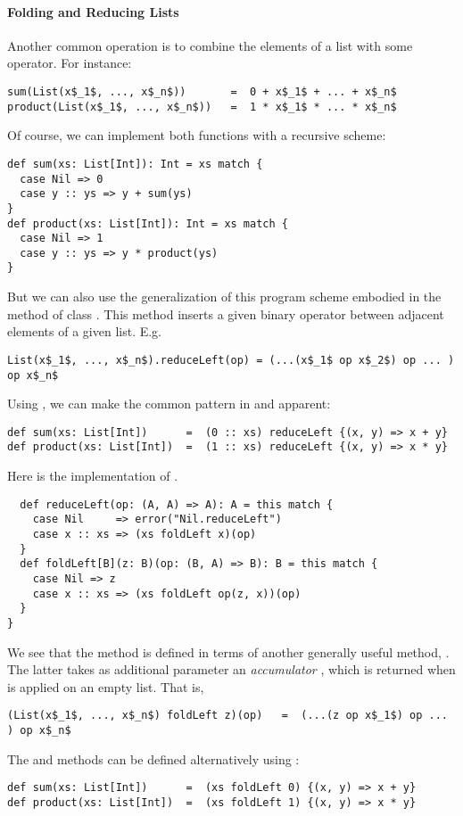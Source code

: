\paragraph{Folding and Reducing Lists}
Another common operation is to combine the elements of a list with
some operator.  For instance:
\begin{lstlisting}
sum(List(x$_1$, ..., x$_n$))       =  0 + x$_1$ + ... + x$_n$
product(List(x$_1$, ..., x$_n$))   =  1 * x$_1$ * ... * x$_n$
\end{lstlisting}
Of course, we can implement both functions with a
recursive scheme:
\begin{lstlisting}
def sum(xs: List[Int]): Int = xs match {
  case Nil => 0
  case y :: ys => y + sum(ys)
}
def product(xs: List[Int]): Int = xs match {
  case Nil => 1
  case y :: ys => y * product(ys)
}
\end{lstlisting}
But we can also use the generalization of this program scheme embodied
in the  method of class .  This method
inserts a given binary operator between adjacent elements of a given list.
E.g.\ 
\begin{lstlisting}
List(x$_1$, ..., x$_n$).reduceLeft(op) = (...(x$_1$ op x$_2$) op ... ) op x$_n$
\end{lstlisting}
Using , we can make the common pattern
in  and  apparent:
\begin{lstlisting}
def sum(xs: List[Int])      =  (0 :: xs) reduceLeft {(x, y) => x + y}
def product(xs: List[Int])  =  (1 :: xs) reduceLeft {(x, y) => x * y}
\end{lstlisting}
Here is the implementation of .
\begin{lstlisting}
  def reduceLeft(op: (A, A) => A): A = this match {
    case Nil     => error("Nil.reduceLeft")
    case x :: xs => (xs foldLeft x)(op)
  }
  def foldLeft[B](z: B)(op: (B, A) => B): B = this match {
    case Nil => z
    case x :: xs => (xs foldLeft op(z, x))(op)
  }
}
\end{lstlisting}
We see that the  method is defined in terms of
another generally useful method, .  The latter takes as
additional parameter an {\em accumulator} \code{z}, which is returned
when \code{foldLeft} is applied on an empty list. That is,
\begin{lstlisting}
(List(x$_1$, ..., x$_n$) foldLeft z)(op)   =  (...(z op x$_1$) op ... ) op x$_n$
\end{lstlisting}
The  and  methods can be defined alternatively
using \code{foldLeft}:
\begin{lstlisting}
def sum(xs: List[Int])      =  (xs foldLeft 0) {(x, y) => x + y}
def product(xs: List[Int])  =  (xs foldLeft 1) {(x, y) => x * y}
\end{lstlisting}

